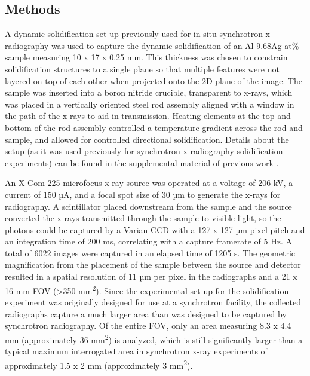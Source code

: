 \subsection{Methods}
A dynamic solidification set-up previously used for in situ synchrotron
x-radiography was used to capture the dynamic solidification of an
Al-9.68Ag at\% sample measuring 10 x 17 x 0.25 mm. This thickness was
chosen to constrain solidification structures to a single plane so that
multiple features were not layered on top of each other when projected
onto the 2D plane of the image. The sample was inserted into a boron
nitride crucible, transparent to x-rays, which was placed in a vertically
oriented steel rod assembly aligned with a window in the path of the
x-rays to aid in transmission. Heating elements at the top and bottom of
the rod assembly controlled a temperature gradient across the rod and
sample, and allowed for controlled directional solidification. Details
about the setup (as it was used previously for synchrotron x-radiography
solidification experiments) can be found in the supplemental material of
previous work \cite{Tourret2017,Clarke2015}.

An X-Com 225 microfocus x-ray source was operated at a voltage
of 206 kV, a current of 150 µA, and a focal spot size of 30 µm to generate
the x-rays for radiography. A scintillator placed downstream from the
sample and the source converted the x-rays transmitted through the sample
to visible light,
so the photons could be captured by a Varian CCD
with a 127 x 127 µm pixel pitch and an integration time of 200 ms,
correlating with a capture framerate of 5 Hz. A total of 6022 images were
captured in an elapsed time of 1205 s. The geometric magnification from
the placement of the sample between the source and detector resulted in a
spatial resolution of 11 µm per pixel in the radiographs and a 21 x 16 mm
FOV (\textgreater350 mm\textsuperscript{2}). Since the experimental set-up for
the solidification experiment was originally
designed for use at a synchrotron facility, the
collected radiographs capture a much larger area than was designed to be
captured by synchrotron radiography. Of the entire FOV, only an area
measuring 8.3 x 4.4 mm (approximately 36 mm\textsuperscript{2}) is analyzed,
which is still significantly
larger than a typical maximum interrogated area in synchrotron x-ray
experiments of approximately 1.5 x 2 mm
(approximately 3 mm\textsuperscript{2}).

